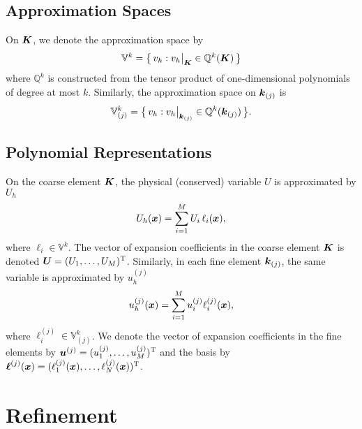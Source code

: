\documentclass[10pt]{article}
\newcommand{\trans}{\textsc{T}}
\begin{document}
\subsection{Approximation Spaces}

On $\boldsymbol{K}$, we denote the approximation space by
\begin{equation}
  \mathbb{V}^{k} = \big\{\,v_{h} : v_{h}\big|_{\boldsymbol{K}}\in\mathbb{Q}^{k}(\boldsymbol{K})\,\big\}
\end{equation}
where $\mathbb{Q}^{k}$ is constructed from the tensor product of one-dimensional polynomials of degree at most $k$.
Similarly, the approximation space on $\boldsymbol{k}_{(j)}$ is
\begin{equation}
  \mathbb{V}_{(j)}^{k} = \big\{\,v_{h} : v_{h}\big|_{\boldsymbol{k}_{(j)}}\in\mathbb{Q}^{k}(\boldsymbol{k}_{(j)})\,\big\}.
\end{equation}

\subsection{Polynomial Representations}

On the coarse element $\boldsymbol{K}$, the physical (conserved) variable $U$ is approximated by $U_{h}$
\begin{equation}
  U_{h}(\boldsymbol{x}) = \sum_{i=1}^{M}U_{i}\,\ell_{i}(\boldsymbol{x}),
\end{equation}
where $\ell_{i}\in\mathbb{V}^{k}$.
The vector of expansion coefficients in the coarse element $\boldsymbol{K}$ is denoted $\vect{U}=(U_{1},\ldots,U_{M})^{\trans}$.
Similarly, in each fine element $\boldsymbol{k}_{(j)}$, the same variable is approximated by $u_{h}^{(j)}$
\begin{equation}
  u_{h}^{(j)}(\boldsymbol{x})=\sum_{i=1}^{M}u_{i}^{(j)}\ell_{i}^{(j)}(\boldsymbol{x}),
\end{equation}
where $\ell_{i}^{(j)}\in\mathbb{V}_{(j)}^{k}$.
We denote the vector of expansion coefficients in the fine elements by $\vect{u}^{(j)}=(u_{1}^{(j)},\ldots,u_{M}^{(j)})^{\trans}$ and the basis by $\vect{\ell}^{(j)}(\vect{x})=(\ell_{1}^{(j)}(\vect{x}),\ldots,\ell_{N}^{(j)}(\vect{x}))^{\trans}$.

\section{Refinement}
\end{document}
